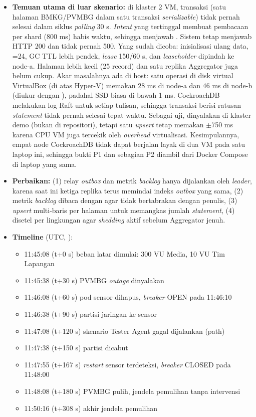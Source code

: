 \begin{enumerate}
\begin{itemize}
\item \textbf{Temuan utama di luar skenario:} di klaster 2 VM, transaksi  (satu halaman BMKG/PVMBG dalam satu transaksi \textit{serializable}) tidak pernah selesai dalam siklus \textit{polling} 30 s. \textit{Intent} yang tertinggal membuat pembacaan per shard (800 ms) habis waktu, sehingga  menjawab . Sistem tetap menjawab HTTP 200 dan tidak pernah 500. Yang sudah dicoba: inisialisasi ulang data, =24, GC TTL lebih pendek, \textit{lease} 150/60 s, dan \textit{leaseholder} dipindah ke node-a. Halaman lebih kecil (25 record) dan satu replika Aggregator juga belum cukup. Akar masalahnya ada di host: satu operasi  di disk virtual VirtualBox (di atas Hyper-V) memakan 28 ms di node-a dan 46 ms di node-b (diukur dengan ), padahal SSD biasa di bawah 1 ms. CockroachDB melakukan  log Raft untuk setiap tulisan, sehingga transaksi berisi ratusan \textit{statement} tidak pernah selesai tepat waktu. Sebagai uji,  dinyalakan di klaster demo (bukan di repositori), tetapi satu \textit{upsert} tetap memakan $\pm$750 ms karena CPU VM juga tercekik oleh \textit{overhead} virtualisasi. Kesimpulannya, empat node CockroachDB tidak dapat berjalan layak di dua VM pada satu laptop ini, sehingga bukti P1 dan sebagian P2 diambil dari Docker Compose di laptop yang sama.
\item \textbf{Perbaikan:} (1) relay \textit{outbox} dan metrik \textit{backlog} hanya dijalankan oleh \textit{leader}, karena saat ini ketiga replika terus memindai indeks \textit{outbox} yang sama, (2) metrik \textit{backlog} dibaca dengan  agar tidak bertabrakan dengan penulis, (3) \textit{upsert} multi-baris per halaman untuk memangkas jumlah \textit{statement}, (4)  disetel per lingkungan agar \textit{shedding} aktif sebelum Aggregator jenuh.
\item \textbf{Timeline} (UTC, ):
\begin{itemize}
\item 11:45:08 (t+0 s) beban latar dimulai: 300 VU Media, 10 VU Tim Lapangan
\item 11:45:38 (t+30 s) PVMBG \textit{outage} dinyalakan
\item 11:46:08 (t+60 s) pod sensor dihapus, \textit{breaker} OPEN pada 11:46:10
\item 11:46:38 (t+90 s) partisi jaringan ke sensor
\item 11:47:08 (t+120 s) skenario Tester Agent gagal dijalankan (path)
\item 11:47:38 (t+150 s) partisi dicabut
\item 11:47:55 (t+167 s) \textit{restart} sensor terdeteksi, \textit{breaker} CLOSED pada 11:48:00
\item 11:48:08 (t+180 s) PVMBG pulih, jendela pemulihan tanpa intervensi
\item 11:50:16 (t+308 s) akhir jendela pemulihan
\end{itemize}
\end{itemize}
\end{enumerate}

